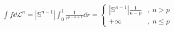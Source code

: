\documentclass[12pt]{article}
\theoremstyle{plain}
\begin{document}
\begin{enumerate}[(i)]
        \begin{align*}
            \int f \dd \mathcal{L}^n = |\mathbb{S}^{n-1}|\int_0^1 \frac{1}{r^{p-n+1}} \dd r = \begin{cases}
                |\mathbb{S}^{n-1}|\frac{1}{n-p} &,\ n > p \\
                +\infty &,\ n \leq p
            \end{cases}
        \end{align*}

\end{enumerate}
\end{document}
